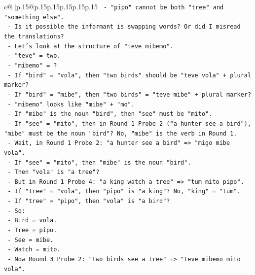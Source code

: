 \documentclass{article}
\begin{document}
{\begin{supertabular}{c@{$\;$}|p{.15\linewidth}@{}p{.15\linewidth}p{.15\linewidth}p{.15\linewidth}p{.15\linewidth}p{.15\linewidth}}
{{{\texttt{                {-} "pipo" cannot be both "tree" and "something else".} \\
\texttt{                {-} Is it possible the informant is swapping words? Or did I misread the translations?} \\
\texttt{                {-} Let's look at the structure of "teve mibemo".} \\
\texttt{                  {-} "teve" = two.} \\
\texttt{                  {-} "mibemo" = ?} \\
\texttt{                  {-} If "bird" = "vola", then "two birds" should be "teve vola" + plural marker?} \\
\texttt{                  {-} If "bird" = "mibe", then "two birds" = "teve mibe" + plural marker?} \\
\texttt{                  {-} "mibemo" looks like "mibe" + "mo".} \\
\texttt{                  {-} If "mibe" is the noun "bird", then "see" must be "mito".} \\
\texttt{                  {-} If "see" = "mito", then in Round 1 Probe 2 ("a hunter see a bird"), "mibe" must be the noun "bird"? No, "mibe" is the verb in Round 1.} \\
\texttt{                  {-} Wait, in Round 1 Probe 2: "a hunter see a bird" => "migo mibe vola".} \\
\texttt{                    {-} If "see" = "mito", then "mibe" is the noun "bird".} \\
\texttt{                    {-} Then "vola" is "a tree"?} \\
\texttt{                    {-} But in Round 1 Probe 4: "a king watch a tree" => "tum mito pipo".} \\
\texttt{                    {-} If "tree" = "vola", then "pipo" is "a king"? No, "king" = "tum".} \\
\texttt{                    {-} If "tree" = "pipo", then "vola" is "a bird"?} \\
\texttt{                    {-} So:} \\
\texttt{                      {-} Bird = vola.} \\
\texttt{                      {-} Tree = pipo.} \\
\texttt{                      {-} See = mibe.} \\
\texttt{                      {-} Watch = mito.} \\
\texttt{                  {-} Now Round 3 Probe 2: "two birds see a tree" => "teve mibemo mito vola".} \\
}}}
\end{supertabular}}
\end{document}
